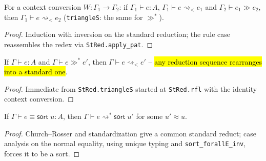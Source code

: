 \begin{theorem}
\label{thm:stred-triangle}
\leanok
{}

 For a context conversion $W:\Gamma_1\to\Gamma_2$: if $\Gamma_1\vdash e:A$,
$\Gamma_1\vdash e\rightsquigarrow_< e_1$ and $\Gamma_2\vdash e_1\gg e_2$, then
$\Gamma_1\vdash e\rightsquigarrow_< e_2$ (\texttt{triangleS}: the same for $\gg^*$).
\end{theorem}
\begin{proof}
\leanok
{} Induction with inversion on the standard reduction; the rule case reassembles the
redex via \texttt{StRed.apply\_pat}.
\end{proof}

\begin{theorem}[Standardization]
\label{thm:parreds-standard}
\leanok
{}

 If $\Gamma\vdash e:A$ and $\Gamma\vdash e\gg^* e'$, then
$\Gamma\vdash e\rightsquigarrow_< e'$ -- \hl{any reduction sequence rearranges into a standard
one}. \stTainted{}
\end{theorem}
\begin{proof}
\leanok
{} Immediate from \texttt{StRed.triangleS} started at \texttt{StRed.rfl} with the
identity context conversion.
\end{proof}

\begin{theorem}
\label{thm:reduce-sort}
\leanok
{}

 If $\Gamma\vdash e\equiv\mathsf{sort}\;u:A$, then
$\Gamma\vdash e\rightsquigarrow^*\mathsf{sort}\;u'$ for some $u'\approx u$.
\end{theorem}
\begin{proof}
\leanok
{} Church--Rosser and standardization give a common standard reduct; case analysis on
the normal equality, using unique typing and \texttt{sort\_forallE\_inv}, forces it to be a
sort.
\end{proof}

